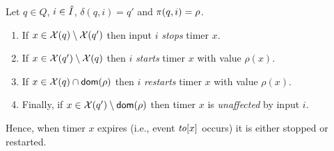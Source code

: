 Let $q \in Q$, $i \in \hat{I}$, $\delta(q,i)=q'$ and $\pi(q,i)=\rho$.
\begin{enumerate}
\item
If $x \in\mathcal{X}(q) \setminus \mathcal{X}(q')$ then input $i$ \emph{stops} timer $x$.
\item
If $x \in \mathcal{X}(q') \setminus \mathcal{X}(q)$ then $i$ \emph{starts} timer $x$ with value $\rho(x)$.
\item
If $x \in \mathcal{X}(q) \cap {\textsf{dom}}(\rho)$ then $i$ \emph{restarts} timer $x$ with value $\rho(x)$.
\item
Finally, if $x \in \mathcal{X}(q') \setminus {\textsf{dom}}(\rho)$ then timer $x$ is \emph{unaffected} by input $i$.
\end{enumerate}
Hence, when timer $x$ expires (i.e., event $\mathit{to}[x]$ occurs) it is either stopped or restarted.

